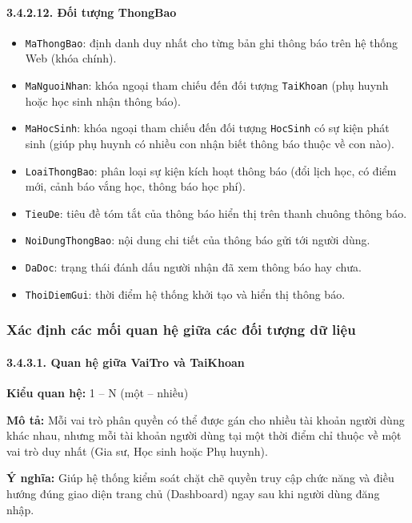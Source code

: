 \documentclass[12pt,a4paper]{article}
\begin{document}
\paragraph{3.4.2.12. Đối tượng ThongBao}\mbox{}
\begin{itemize}\setlength{\itemsep}{2pt}\setlength{\parskip}{0pt}
    \item \texttt{MaThongBao}: định danh duy nhất cho từng bản ghi thông báo trên hệ thống Web (khóa chính).
    \item \texttt{MaNguoiNhan}: khóa ngoại tham chiếu đến đối tượng \texttt{TaiKhoan} (phụ huynh hoặc học sinh nhận thông báo).
    \item \texttt{MaHocSinh}: khóa ngoại tham chiếu đến đối tượng \texttt{HocSinh} có sự kiện phát sinh (giúp phụ huynh có nhiều con nhận biết thông báo thuộc về con nào).
    \item \texttt{LoaiThongBao}: phân loại sự kiện kích hoạt thông báo (đổi lịch học, có điểm mới, cảnh báo vắng học, thông báo học phí).
    \item \texttt{TieuDe}: tiêu đề tóm tắt của thông báo hiển thị trên thanh chuông thông báo.
    \item \texttt{NoiDungThongBao}: nội dung chi tiết của thông báo gửi tới người dùng.
    \item \texttt{DaDoc}: trạng thái đánh dấu người nhận đã xem thông báo hay chưa.
    \item \texttt{ThoiDiemGui}: thời điểm hệ thống khởi tạo và hiển thị thông báo.
\end{itemize}

\subsubsection{Xác định các mối quan hệ giữa các đối tượng dữ liệu}

\paragraph{3.4.3.1. Quan hệ giữa VaiTro và TaiKhoan}\mbox{}\par
\textbf{Kiểu quan hệ:} 1 -- N (một -- nhiều)\par
\textbf{Mô tả:} Mỗi vai trò phân quyền có thể được gán cho nhiều tài khoản người dùng khác nhau, nhưng mỗi tài khoản người dùng tại một thời điểm chỉ thuộc về một vai trò duy nhất (Gia sư, Học sinh hoặc Phụ huynh).\par
\textbf{Ý nghĩa:} Giúp hệ thống kiểm soát chặt chẽ quyền truy cập chức năng và điều hướng đúng giao diện trang chủ (Dashboard) ngay sau khi người dùng đăng nhập.
\end{document}

